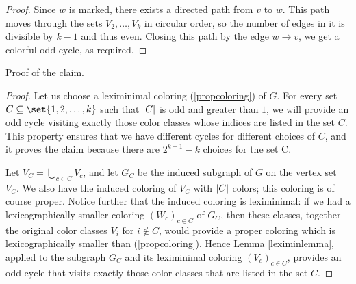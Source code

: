 \begin{problem}
\begin{proof}
Since $w$ is marked, there exists a directed path from $v$ to $w$. This path moves through the sets $V_2, \dots , V_k$ in circular order, so the number of edges in it is divisible by $k - 1$ and thus even.
Closing this path by the edge $w \rightarrow v$, we get a colorful odd cycle, as required.
\end{proof}

Proof of the claim. 
\begin{proof}
Let us choose a leximinimal coloring (\ref{propcoloring}) of $G$. For every set $C \subseteq  \set{1, 2, \dots, k}$ such that $\lvert C\rvert$ is odd and greater than $1$, we will provide an odd cycle visiting exactly those color classes whose indices are listed in the set $C$. This property ensures that we have different cycles for different choices of $C$, and it proves the claim because there are $2^{k-1} - k$ choices for the set C.


Let $V_C = \bigcup_{c \in C}V_c$, and let $G_C$ be the induced subgraph of $G$ on the vertex set $V_C$. We also have the induced coloring of $V_C$ with $\lvert C\rvert$ colors; this coloring is of course proper. Notice further that the induced coloring is leximinimal: if we had a lexicographically smaller coloring  
$(W_c)_{c \in C}$ of $G_C$, then these classes, together the original color classes $V_i$ for $i \notin C$, would provide a proper coloring which is lexicographically smaller than (\ref{propcoloring}). Hence Lemma \ref{leximinlemma}, applied to the subgraph $G_C$ and its leximinimal coloring $(V_c)_{c \in C}$, provides an odd cycle that visits exactly those color classes that are listed in the set $C$. 
\end{proof}
\end{problem}
%
\filbreak

